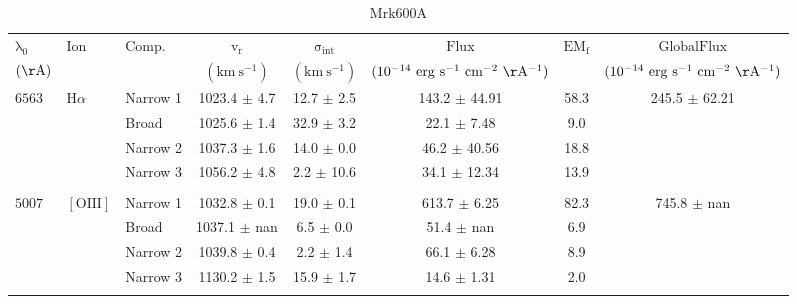 \documentclass{article}
\begin{document}
\begin{table}[tbp]
\centering
\begin{tabular}{lllccccc}
\hline
$\mathrm{\lambda_0}$ & $\mathrm{Ion}$ & $\mathrm{Comp.}$ & $\mathrm{v_r}$ & $\mathrm{\sigma_{int}}$ & $\mathrm{Flux}$ & $\mathrm{EM_f}$ & $\mathrm{GlobalFlux}$ \\ 
$(\mathrm{\AA})$ &  &  & $(\mathrm{km \ s^{-1}})$ & $(\mathrm{km \ s^{-1}})$ & $(\mathrm{10^{-14} \ erg \ s^{-1} \ cm^{-2} \ \AA^{-1}})$ &  & $(\mathrm{10^{-14} \ erg \ s^{-1} \ cm^{-2} \ \AA^{-1}})$ \\ 
\hline
$6563$ & $\mathrm{H}\alpha$ & Narrow 1 & 1023.4 $\pm$ 4.7 & 12.7 $\pm$ 2.5 & 143.2 $\pm$ 44.91 & 58.3 & 245.5 $\pm$ 62.21 \\ 
 &  & Broad & 1025.6 $\pm$ 1.4 & 32.9 $\pm$ 3.2 & 22.1 $\pm$ 7.48 & 9.0 &  \\ 
 &  & Narrow 2 & 1037.3 $\pm$ 1.6 & 14.0 $\pm$ 0.0 & 46.2 $\pm$ 40.56 & 18.8 &  \\ 
 &  & Narrow 3 & 1056.2 $\pm$ 4.8 & 2.2 $\pm$ 10.6 & 34.1 $\pm$ 12.34 & 13.9 &  \\ 
 &  &  &  &  &  &  &  \\ 
$5007$ & $\mathrm{[OIII]}$ & Narrow 1 & 1032.8 $\pm$ 0.1 & 19.0 $\pm$ 0.1 & 613.7 $\pm$ 6.25 & 82.3 & 745.8 $\pm$ nan \\ 
 &  & Broad & 1037.1 $\pm$ nan & 6.5 $\pm$ 0.0 & 51.4 $\pm$ nan & 6.9 &  \\ 
 &  & Narrow 2 & 1039.8 $\pm$ 0.4 & 2.2 $\pm$ 1.4 & 66.1 $\pm$ 6.28 & 8.9 &  \\ 
 &  & Narrow 3 & 1130.2 $\pm$ 1.5 & 15.9 $\pm$ 1.7 & 14.6 $\pm$ 1.31 & 2.0 &  \\ 
 &  &  &  &  &  &  &  \\ 
\hline
\end{tabular}
\caption{Mrk600A}
\end{table}
\end{document}
